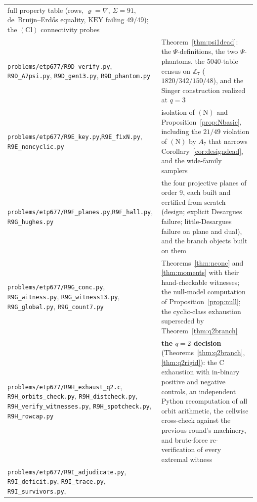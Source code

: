 \documentclass[11pt]{article}
\theoremstyle{plain}
\theoremstyle{definition}
\theoremstyle{remark}
\numberwithin{equation}{section}
\newcommand{\Z}{\mathbb{Z}}
\begin{document}
\begin{longtable}{p{}p{}}
full property table (rows, $\varrho=\nabla$, $\Sigma = 91$,
de~Bruijn--Erd\H{o}s equality, $\mathrm{KEY}$ failing $49/49$); the
$(\mathrm{Cl})$ connectivity probes\\
\texttt{problems\slash etp677\slash R9D\_verify.py},\newline
\texttt{R9D\_A7psi.py}, \texttt{R9D\_gen13.py}, \texttt{R9D\_phantom.py} &
Theorem~\ref{thm:psi1dead}: the $\Psi$-definitions, the two $\Psi$-phantoms, the
$5040$-table census on $\Z_7$ ($1820/342/150/48$), and the Singer construction
realized at $q = 3$\\
\texttt{problems\slash etp677\slash R9E\_key.py},\newline\texttt{R9E\_fixN.py},
\texttt{R9E\_noncyclic.py} & isolation of $(\mathrm{N})$ and
Proposition~\ref{prop:Nbasic}, including the $21/49$ violation of $(\mathrm{N})$ by
$A_7$ that narrows Corollary~\ref{cor:designdead}, and the wide-family samplers\\
\texttt{problems\slash etp677\slash R9F\_planes.py},\newline\texttt{R9F\_hall.py},
\texttt{R9G\_hughes.py} & the four projective planes of order $9$, each built and
certified from scratch (design; explicit Desargues failure; little-Desargues
failure on plane and dual), and the branch objects built on them\\
\texttt{problems\slash etp677\slash R9G\_conc.py},\newline
\texttt{R9G\_witness.py}, \texttt{R9G\_witness13.py}, \texttt{R9G\_global.py},
\texttt{R9G\_count7.py} & Theorems~\ref{thm:nconc} and \ref{thm:moments} with their
hand-checkable witnesses; the null-model computation of
Proposition~\ref{prop:null}; the cyclic-class exhaustion superseded by
Theorem~\ref{thm:q2branch}\\
\texttt{problems\slash etp677\slash R9H\_exhaust\_q2.c},\newline
\texttt{R9H\_orbits\_check.py}, \texttt{R9H\_distcheck.py},
\texttt{R9H\_verify\_witnesses.py}, \texttt{R9H\_spotcheck.py},
\texttt{R9H\_rowcap.py} & \textbf{the $q = 2$ decision}
(Theorems~\ref{thm:q2branch}, \ref{thm:q2rigid}): the C exhaustion with in-binary
positive and negative controls, an independent Python recomputation of all orbit
arithmetic, the cellwise cross-check against the previous round's machinery, and
brute-force re-verification of every extremal witness\\
\texttt{problems\slash etp677\slash R9I\_adjudicate.py},\newline
\texttt{R9I\_deficit.py}, \texttt{R9I\_trace.py}, \texttt{R9I\_survivors.py},

\end{longtable}
\end{document}
